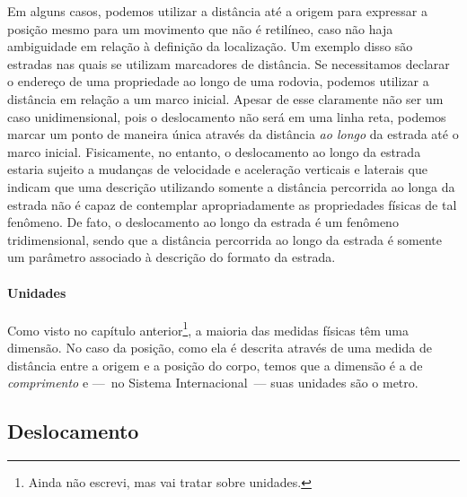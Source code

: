Em alguns casos, podemos utilizar a distância até a origem para expressar a posição mesmo para um movimento que não é retilíneo, caso não haja ambiguidade em relação à definição da localização. Um exemplo disso são estradas nas quais se utilizam marcadores de distância. Se necessitamos declarar o endereço de uma propriedade ao longo de uma rodovia, podemos utilizar a distância em relação a um marco inicial. Apesar de esse claramente não ser um caso unidimensional, pois o deslocamento não será em uma linha reta, podemos marcar um ponto de maneira única através da distância \emph{ao longo} da estrada até o marco inicial. Fisicamente, no entanto, o deslocamento ao longo da estrada estaria sujeito a mudanças de velocidade e aceleração verticais e laterais que indicam que uma descrição utilizando somente a distância percorrida ao longa da estrada não é capaz de contemplar apropriadamente as propriedades físicas de tal fenômeno. De fato, o deslocamento ao longo da estrada é um fenômeno tridimensional, sendo que a distância percorrida ao longo da estrada é somente um parâmetro associado à descrição do formato da estrada.

\paragraph{Unidades}

Como visto no capítulo anterior\footnote{Ainda não escrevi, mas vai tratar sobre unidades.}, a maioria das medidas físicas têm uma dimensão. No caso da posição, como ela é descrita através de uma medida de distância entre a origem e a posição do corpo, temos que a dimensão é a de \emph{comprimento} e ---~no Sistema Internacional~--- suas unidades são o metro.

\subsection{Deslocamento}

